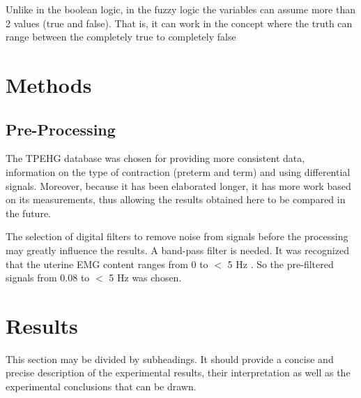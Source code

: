 \documentclass[bioengineering,article,submit,moreauthors,pdftex,10pt,a4paper]{mdpi}
\begin{document}
 Unlike in the boolean logic, in the fuzzy logic the variables can assume more than 2 values (true and false). That is, it can work in the concept where the truth can range between the completely true to completely false \cite{ref-novak}
 
 
 
 \section{Methods}

 \subsection{Pre-Processing}
 
 The TPEHG database was chosen for providing more consistent data, information on the type of contraction (preterm and term) and using differential signals. Moreover, because it has been elaborated longer, it has more work based on its measurements, thus allowing the results obtained here to be compared in the future.
 
 The selection of digital filters to remove noise from signals
 before the processing may greatly influence the results.
 A band-pass filter is needed. It was recognized that the uterine
 EMG content ranges from 0 to $<$ 5 Hz \cite{ref-devedeux}. So the pre-filtered signals from 0.08 to $<$ 5 Hz was chosen.
 
 
 
 
 
 
 
 
 
 
 
 
 
 
 
 
 
 
 
 
 
 
 


 
 
\section{Results}

This section may be divided by subheadings. It should provide a concise and precise description of the experimental results, their interpretation as well as the experimental conclusions that can be drawn.
\end{document}
